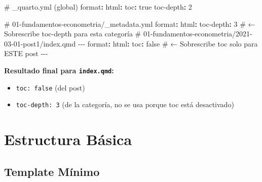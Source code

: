 \documentclass[
  doc,
  floatsintext,
  longtable,
  a4paper,
  nolmodern,
  notxfonts,
  notimes,
  12pt,
  colorlinks=true,linkcolor=blue,citecolor=blue,urlcolor=blue]{apa7}
\newenvironment{Shaded}{\begin{snugshade}}{\end{snugshade}}
\newcommand{\AttributeTok}[1]{\textcolor[rgb]{0.40,0.45,0.13}{#1}}
\newcommand{\CharTok}[1]{\textcolor[rgb]{0.13,0.47,0.30}{#1}}
\newcommand{\CommentTok}[1]{\textcolor[rgb]{0.37,0.37,0.37}{#1}}
\newcommand{\DecValTok}[1]{\textcolor[rgb]{0.68,0.00,0.00}{#1}}
\newcommand{\FunctionTok}[1]{\textcolor[rgb]{0.28,0.35,0.67}{#1}}
\newcommand{\KeywordTok}[1]{\textcolor[rgb]{0.00,0.23,0.31}{\textbf{#1}}}
\newcommand{\PreprocessorTok}[1]{\textcolor[rgb]{0.68,0.00,0.00}{#1}}
\providecommand{\tightlist}{%
  \setlength{\itemsep}{0pt}\setlength{\parskip}{0pt}}
\begin{document}
\begin{Shaded}
\begin{Highlighting}[]
\CommentTok{\# \_quarto.yml (global)}
\FunctionTok{format}\KeywordTok{:}
\AttributeTok{  }\FunctionTok{html}\KeywordTok{:}
\AttributeTok{    }\FunctionTok{toc}\KeywordTok{:}\AttributeTok{ }\CharTok{true}
\AttributeTok{    }\FunctionTok{toc{-}depth}\KeywordTok{:}\AttributeTok{ }\DecValTok{2}

\CommentTok{\# 01{-}fundamentos{-}econometria/\_metadata.yml}
\FunctionTok{format}\KeywordTok{:}
\AttributeTok{  }\FunctionTok{html}\KeywordTok{:}
\AttributeTok{    }\FunctionTok{toc{-}depth}\KeywordTok{:}\AttributeTok{ }\DecValTok{3}\CommentTok{        \# ← Sobrescribe toc{-}depth para esta categoría}
\AttributeTok{    }
\CommentTok{\# 01{-}fundamentos{-}econometria/2021{-}03{-}01{-}post1/index.qmd}
\PreprocessorTok{{-}{-}{-}}
\FunctionTok{format}\KeywordTok{:}
\AttributeTok{  }\FunctionTok{html}\KeywordTok{:}
\AttributeTok{    }\FunctionTok{toc}\KeywordTok{:}\AttributeTok{ }\CharTok{false}\CommentTok{          \# ← Sobrescribe toc solo para ESTE post}
\PreprocessorTok{{-}{-}{-}}
\end{Highlighting}
\end{Shaded}

\textbf{Resultado final para \texttt{index.qmd}:}

\begin{itemize}
\tightlist
\item
  \texttt{toc:\ false} (del post)
\item
  \texttt{toc-depth:\ 3} (de la categoría, no se usa porque toc está
  desactivado)
\end{itemize}

\section{Estructura Básica}\label{estructura-buxe1sica}

\subsection{Template Mínimo}\label{template-muxednimo}
\end{document}
